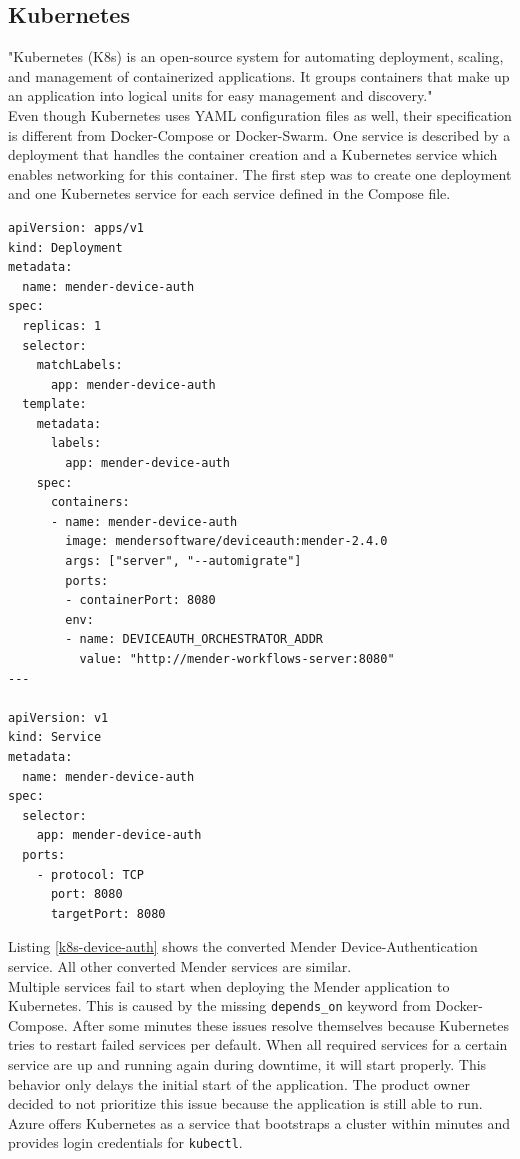 \subsection{Kubernetes}
"Kubernetes (K8s) is an open-source system for automating deployment, scaling, and management of containerized applications.
It groups containers that make up an application into logical units for easy management and discovery."\cite{k8s}\\
Even though Kubernetes uses YAML configuration files as well, their specification is different from Docker-Compose or Docker-Swarm. One service is described by a deployment that handles the container creation and a Kubernetes service which enables networking for this container. The first step was to create one deployment and one Kubernetes service for each service defined in the Compose file.
\begin{code}
  \label{k8s-device-auth}
  \begin{verbatim}
apiVersion: apps/v1
kind: Deployment
metadata:
  name: mender-device-auth
spec:
  replicas: 1
  selector:
    matchLabels:
      app: mender-device-auth
  template:
    metadata:
      labels:
        app: mender-device-auth
    spec:
      containers:
      - name: mender-device-auth
        image: mendersoftware/deviceauth:mender-2.4.0
        args: ["server", "--automigrate"]
        ports:
        - containerPort: 8080
        env:
        - name: DEVICEAUTH_ORCHESTRATOR_ADDR
          value: "http://mender-workflows-server:8080"
---

apiVersion: v1
kind: Service
metadata:
  name: mender-device-auth
spec:
  selector:
    app: mender-device-auth
  ports:
    - protocol: TCP
      port: 8080
      targetPort: 8080
  \end{verbatim}
\end{code}
Listing \ref{k8s-device-auth} shows the converted Mender Device-Authentication service. All other converted Mender services are similar.\\
Multiple services fail to start when deploying the Mender application to Kubernetes. This is caused by the missing \verb|depends_on| keyword from Docker-Compose. After some minutes these issues resolve themselves because Kubernetes tries to restart failed services per default. When all required services for a certain service are up and running again during downtime, it will start properly. This behavior only delays the initial start of the application. The product owner decided to not prioritize this issue because the application is still able to run.\\
Azure offers Kubernetes as a service that bootstraps a cluster within minutes and provides login credentials for \verb|kubectl|.

